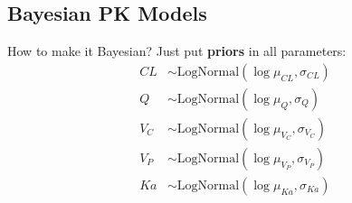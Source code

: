 \subsection{Bayesian PK Models}
\begin{frame}{How to make it Bayesian?}
    Just put \textbf{priors} in all parameters:
    $$
        \begin{aligned}
            CL  & \sim \text{LogNormal}(\log{\mu_{CL}}, \sigma_{CL})   \\
            Q   & \sim \text{LogNormal}(\log{\mu_{Q}}, \sigma_{Q})     \\
            V_C & \sim \text{LogNormal}(\log{\mu_{V_C}}, \sigma_{V_C}) \\
            V_P & \sim \text{LogNormal}(\log{\mu_{V_P}}, \sigma_{V_P}) \\
            Ka  & \sim \text{LogNormal}(\log{\mu_{Ka}}, \sigma_{Ka})
        \end{aligned}
    $$
\end{frame}